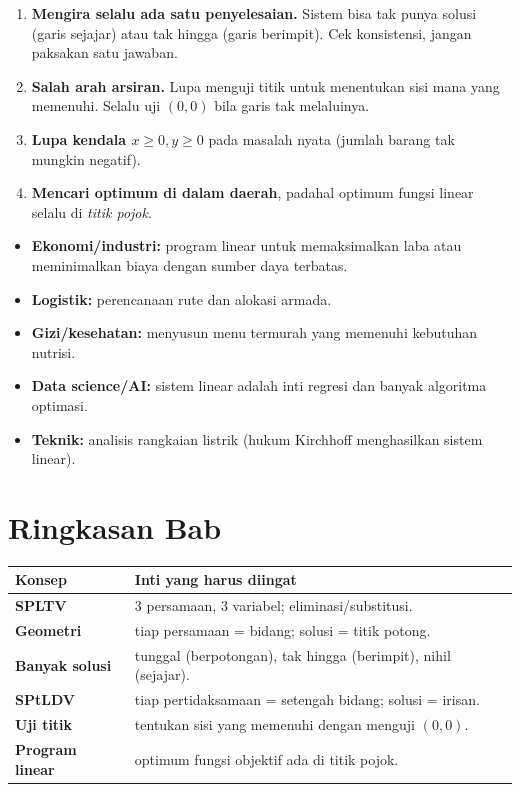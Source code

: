 \documentclass[11pt,a4paper]{report}
\theoremstyle{gaya}
\begin{document}
\begin{kesalahan}
\begin{enumerate}[leftmargin=*,topsep=2pt]
  \item \textbf{Mengira selalu ada satu penyelesaian.} Sistem bisa tak punya solusi (garis sejajar) atau tak hingga (garis berimpit). Cek konsistensi, jangan paksakan satu jawaban.
  \item \textbf{Salah arah arsiran.} Lupa menguji titik untuk menentukan sisi mana yang memenuhi. Selalu uji $(0,0)$ bila garis tak melaluinya.
  \item \textbf{Lupa kendala $x\ge0,y\ge0$} pada masalah nyata (jumlah barang tak mungkin negatif).
  \item \textbf{Mencari optimum di dalam daerah}, padahal optimum fungsi linear selalu di \emph{titik pojok}.
\end{enumerate}
\end{kesalahan}

\begin{dunianyata}
\begin{itemize}[leftmargin=*,topsep=2pt]
  \item \textbf{Ekonomi/industri:} program linear untuk memaksimalkan laba atau meminimalkan biaya dengan sumber daya terbatas.
  \item \textbf{Logistik:} perencanaan rute dan alokasi armada.
  \item \textbf{Gizi/kesehatan:} menyusun menu termurah yang memenuhi kebutuhan nutrisi.
  \item \textbf{Data science/AI:} sistem linear adalah inti regresi dan banyak algoritma optimasi.
  \item \textbf{Teknik:} analisis rangkaian listrik (hukum Kirchhoff menghasilkan sistem linear).
\end{itemize}
\end{dunianyata}

\section*{Ringkasan Bab}
\begin{center}
\begin{tabular}{>{\bfseries}p{3.5cm} p{10.2cm}}
\toprule
Konsep & Inti yang harus diingat \\
\midrule
SPLTV & 3 persamaan, 3 variabel; eliminasi/substitusi. \\
Geometri & tiap persamaan = bidang; solusi = titik potong. \\
Banyak solusi & tunggal (berpotongan), tak hingga (berimpit), nihil (sejajar). \\
SPtLDV & tiap pertidaksamaan = setengah bidang; solusi = irisan. \\
Uji titik & tentukan sisi yang memenuhi dengan menguji $(0,0)$. \\
Program linear & optimum fungsi objektif ada di titik pojok. \\
\bottomrule
\end{tabular}
\end{center}
\end{document}
